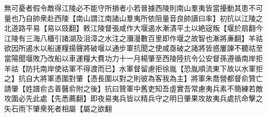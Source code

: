 無可憂者假令敵得江陵必不能守所損者小若晉據西陵則南山羣夷皆當擾動其患不可量也乃自帥衆赴西陵【南山謂江南諸山羣夷所依阻量音良帥讀曰率】初抗以江陵之北道路平易【易以豉翻】敕江陵督張咸作大堰遏水漸漬平土以絶宼叛【堰於扇翻今江陵有三海八櫃引諸湖及沮漳之水注之瀰漫數百里即作堰之故智也漸將亷翻】羊祜欲因所遏水以船運糧揚聲將破堰以通步軍抗聞之使咸亟破之諸將皆惑屢諫不聽祜至當陽聞堰敗乃改船以車運糧大費功力十一月楊肇至西陵陸抗令公安督孫遵循南岸拒羊祜【防托南岸使祜軍不得渡而已】水軍督留慮拒徐胤【恐胤順流東下故以水軍拒之】抗自大將軍憑圍對肇【憑長圍以對之則彼為客我為主】將軍朱喬營都督俞贊亡請肇【姓譜俞古善醫俞附之後】抗曰贊軍中舊吏知吾虛實吾常慮夷兵素不簡練若敵攻圍必先此處【先悉薦翻】即夜易夷兵皆以精兵守之明日肇果攻故夷兵處抗命擊之矢石雨下肇衆死者相屬【屬之欲翻